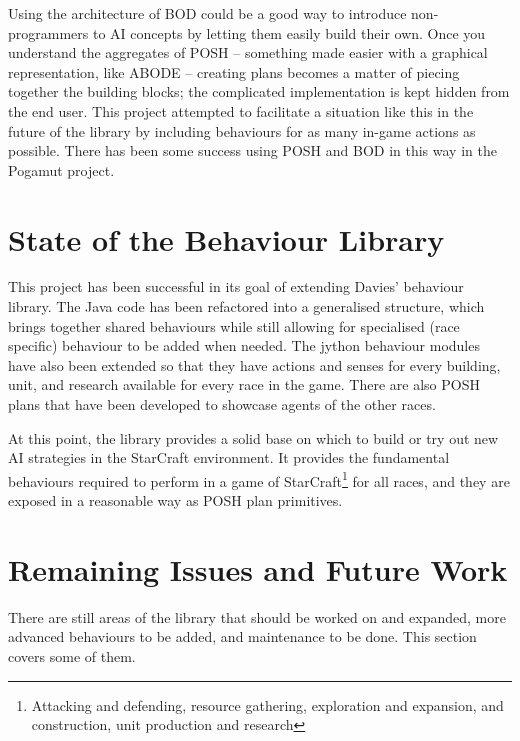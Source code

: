 \documentclass[11pt,openright,a4paper]{report}
\begin{document}
Using the architecture of BOD could be a good way to introduce non-programmers to AI concepts by letting them easily build their own. Once you understand the aggregates of POSH -- something made easier with a graphical representation, like ABODE -- creating plans becomes a matter of piecing together the building blocks; the complicated implementation is kept hidden from the end user. This project attempted to facilitate a situation like this in the future of the library by including behaviours for as many in-game actions as possible. There has been some success using POSH and BOD in this way in the Pogamut project\cite{gemrot2009pogamut}.

\section{State of the Behaviour Library}
This project has been successful in its goal of extending Davies' behaviour library. The Java code has been refactored into a generalised structure, which brings together shared behaviours while still allowing for specialised (race specific) behaviour to be added when needed. The jython behaviour modules have also been extended so that they have actions and senses for every building, unit, and research available for every race in the game. There are also POSH plans that have been developed to showcase agents of the other races.

At this point, the library provides a solid base on which to build or try out new AI strategies in the StarCraft environment. It provides the fundamental behaviours required to perform in a game of StarCraft\footnote{Attacking and defending, resource gathering, exploration and expansion, and construction, unit production and research} for all races, and they are exposed in a reasonable way as POSH plan primitives.

\section{Remaining Issues and Future Work}
There are still areas of the library that should be worked on and expanded, more advanced behaviours to be added, and maintenance to be done. This section covers some of them.
\end{document}

